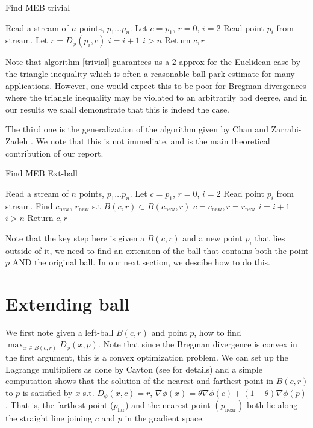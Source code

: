 \documentclass[11pt]{myclass}
\newcommand{\breg}{\ensuremath{D_\phi}}
\begin{document}
\begin{algorithm}
  \caption{Find MEB trivial}
  \begin{algorithmic}
    \STATE Read a stream of $n$ points, $p_1 \ldots p_n$. 
    \STATE Let $c = p_1$, $r = 0$, $i =2$
    \REPEAT 
    \STATE Read point $p_i$ from stream. 
    \IF{$\breg(p_i,c) >r$ }
      \STATE Let $r = \breg(p_i,c)$
    \ENDIF 
    \STATE $i = i+1$
    \UNTIL $i > n$
    \STATE Return $c,r$
  \end{algorithmic}
  \label{trivial}
\end{algorithm}

Note that algorithm \ref{trivial} guarantees us a $2$ approx for the Euclidean case by the triangle inequality which is often a reasonable ball-park estimate for many applications. However, one would expect this to be poor for Bregman divergences where the triangle inequality may be violated to an arbitrarily bad degree, and in our results we shall demonstrate that this is indeed the case.

The third one is the generalization of the algorithm given by Chan and Zarrabi-Zadeh \cite{onepointfive}. We note that this is not immediate, and is the main theoretical contribution of our report.

\begin{algorithm}
  \caption{Find MEB Ext-ball}
  \begin{algorithmic}
    \STATE Read a stream of $n$ points, $p_1 \ldots p_n$. 
    \STATE Let $c = p_1$, $r = 0$, $i =2$
    \REPEAT 
    \STATE Read point $p_i$ from stream. 
    \IF{$\breg(p_i,c) >r$ }
      \STATE Find $c_{\text{new}}$, $r_{\text{new}}$ s.t $B(c,r) \subset B(c_{\text{new}}, r)$
	  \STATE $c = c_{\text{new}}, r = r_{\text{new}}$ 
	\ENDIF
    \STATE $i = i+1$
    \UNTIL $i > n$
    \STATE Return $c,r$
  \end{algorithmic}
  \label{extendalgo}
\end{algorithm}

Note that the key step here is given a $B(c,r)$ and a new point $p_i$ that lies outside of it, we need to find an extension of the ball that contains both the point $p$ AND the original ball. In our next section, we descibe how to do this.

\section{Extending ball}
We first note given a left-ball $B(c,r)$ and point $p$, how to find  $\max_{x \in B(c,r)} \breg(x,p)$. 
Note that since the Bregman divergence is convex in the first argument, this is a convex optimization problem. We can set up the Lagrange multipliers as done by Cayton (see \cite{cayton} for details) and a simple computation shows that the solution of the nearest and farthest point
in $B(c,r)$ to $p$ is satisfied by $x$ s.t. $\breg(x,c) = r$, $\nabla \phi(x) = \theta \nabla \phi(c) + (1 - \theta) \nabla \phi(p)$. That is,
the farthest point ($p_{\text{far}}$) and the nearest point $(p_{\text{near}})$ both lie along the straight line joining $c$ and $p$ in the
gradient space.
\end{document}
